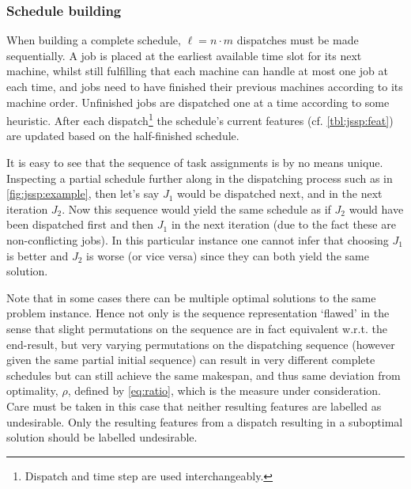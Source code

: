 \documentclass[smallextended]{svjour3}
\begin{document}
	\subsubsection{Schedule building}\label{sec:gen:gametree}
	When building a complete schedule, $\ell=n\cdot m$ dispatches must be made sequentially. 
	A job is placed at the earliest available time slot for its next machine, whilst still fulfilling that each machine can handle at most one job at each time, and jobs need to have finished their previous machines according to its machine order. 
	Unfinished jobs are dispatched one at a time according to some heuristic. After each dispatch\footnote{Dispatch and time step are used interchangeably.} the schedule's current features (cf. \cref{tbl:jssp:feat}) are updated based on the half-finished schedule. 
	
	It is easy to see that the sequence of task assignments is by no means unique. Inspecting a partial schedule further along in the dispatching process such as in \cref{fig:jssp:example}, then let's say $J_1$ would be dispatched next, and in the next iteration $J_2$. Now this sequence would yield the same schedule as if $J_2$ would have been dispatched first and then $J_1$ in the next iteration  (due to the fact these are non-conflicting jobs). 
	In this particular instance one cannot infer that choosing $J_1$ is better and $J_2$ is worse (or vice versa) since they can both yield the same solution.
	
	Note that in some cases there can be multiple optimal solutions to the same problem instance. Hence not only is the sequence representation `flawed' in the sense that slight permutations on the sequence are in fact equivalent w.r.t. the end-result, but very varying permutations on the dispatching sequence (however given the same partial initial sequence) can result in very different complete schedules but can still achieve the same makespan, and thus same deviation from optimality, $\rho$, defined by \cref{eq:ratio}, which is the measure under consideration. Care must be taken in this case that neither resulting features are labelled as undesirable. Only the resulting features from a dispatch resulting in a suboptimal solution should be labelled undesirable. 
	
\end{document}
